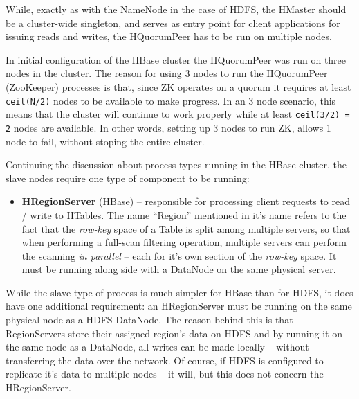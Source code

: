 While, exactly as with the NameNode in the case of HDFS, the HMaster should be a cluster-wide singleton, and serves as entry point for client applications for issuing reads and writes, the HQuorumPeer has to be run on multiple nodes. 

In initial configuration of the HBase cluster the HQuorumPeer was run on three nodes in the cluster. The reason for using 3 nodes to run the HQuorumPeer (ZooKeeper) processes is that, since ZK operates on a quorum it requires at least \verb|ceil(N/2)| nodes to be available to make progress. In an 3 node scenario, this means that the cluster will continue to work properly while at least \verb|ceil(3/2) = 2| nodes are available. In other words, setting up 3 nodes to run ZK, allows 1 node to fail, without stoping the entire cluster.

Continuing the discussion about process types running in the HBase cluster, the slave nodes require one type of component to be running:

\begin{itemize}
\item \textbf{HRegionServer} (HBase) -- responsible for processing client requests to read / write to HTables.
                                        The name ``Region'' mentioned in it's name refers to the fact that the
                                        \textit{row-key} space of a Table is split among multiple servers, so that when
                                        performing a full-scan filtering operation, multiple servers can perform the
                                        scanning \textit{in parallel} -- each for it's own section of the
                                        \textit{row-key} space. It must be running along side with a DataNode on the
                                        same physical server.
                                        
\end{itemize}

While the slave type of process is much simpler for HBase than for HDFS, it does have one additional requirement: an HRegionServer must be running on the same physical node as a HDFS DataNode. The reason behind this is that RegionServers store their assigned region's data on HDFS and by running it on the same node as a DataNode, all writes can be made locally -- without transferring the data over the network. Of course, if HDFS is configured to replicate it's data to multiple nodes -- it will, but this does not concern the HRegionServer.


